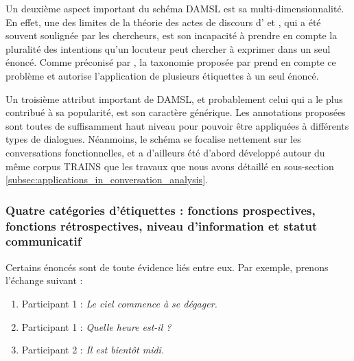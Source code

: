 \documentclass[10pt,a4paper,twoside]{article}
\begin{document}
Un deuxième aspect important du schéma DAMSL est sa multi-dimensionnalité. En effet, une des limites de la théorie des actes de discours d'\citeauthor{austin1975how} et \citeauthor{searle1969speech}, qui a été souvent soulignée par les chercheurs, est son incapacité à prendre en compte la pluralité des intentions qu'un locuteur peut chercher à exprimer dans un seul énoncé. Comme préconisé par \citet{traum1992conversation}, la taxonomie proposée par \citeauthor{core1997coding} prend en compte ce problème et autorise l'application de plusieurs étiquettes à un seul énoncé.

Un troisième attribut important de DAMSL, et probablement celui qui a le plus contribué à sa popularité, est son caractère générique. Les annotations proposées sont toutes de suffisamment haut niveau pour pouvoir être appliquées à différents types de dialogues. Néanmoins, le schéma se focalise nettement sur les conversations fonctionnelles, et a d'ailleurs été d'abord développé autour du même corpus TRAINS que les travaux que nous avons détaillé en sous-section \ref{subsec:applications_in_conversation_analysis}.

\subsubsection{Quatre catégories d'étiquettes : fonctions prospectives, fonctions rétrospectives, niveau d'information et statut communicatif}

Certains énoncés sont de toute évidence liés entre eux. Par exemple, prenons l'échange suivant :

\begin{enumerate}
	\item Participant 1 : \og \textit{Le ciel commence à se dégager.} \fg
	\item Participant 1 : \og \textit{Quelle heure est-il ?} \fg
	\item Participant 2 : \og \textit{Il est bientôt midi.} \fg
\end{enumerate}
\end{document}
